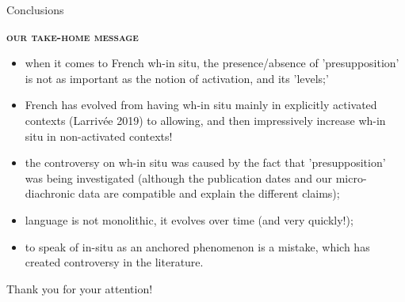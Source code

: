 \documentclass[lesson_slides]{subfiles}
\begin{document}
\begin{frame}[c]{Conclusions}

        \textbf{\textsc{our take-home message}}
        \begin{itemize}
        \item[\ding{227}] when it comes to French wh-in situ, the presence/absence of 'presupposition' is not as important as the notion of activation, and its 'levels;'\pause
        \item[\ding{227}] French has evolved from having wh-in situ mainly in explicitly activated contexts (Larrivée 2019) to allowing, and then impressively increase wh-in situ in non-activated contexts! \pause
        \item[\ding{227}] the controversy on wh-in situ was caused by the fact that 'presupposition' was being investigated \pause (although the publication dates and our micro-diachronic data are compatible and explain the different claims);\pause
        \item[\ding{227}] language is not monolithic, it evolves over time \pause (and very quickly!); \pause
        \item[\ding{227}] to speak of in-situ as an anchored phenomenon is a mistake, which has created controversy in the literature.
        \end{itemize}

\end{frame}
\begin{frame}[c]{}

\begin{center}
    \huge{Thank you for your attention!}
\end{center}
  
\end{frame}
\end{document}
